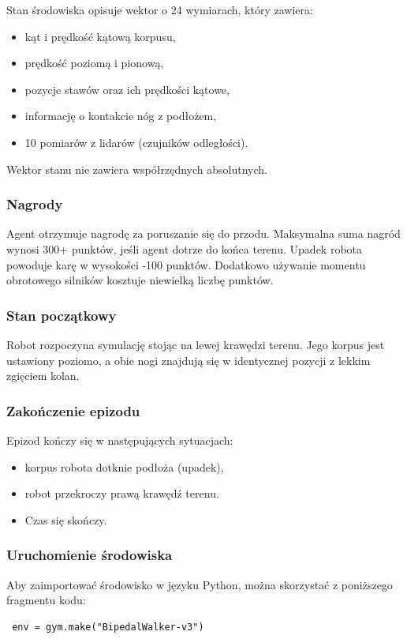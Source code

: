 \documentclass[conference]{IEEEtran}
\begin{document}
Stan środowiska opisuje wektor o 24 wymiarach, który zawiera:
\begin{itemize}
    \item kąt i prędkość kątową korpusu,
    \item prędkość poziomą i pionową,
    \item pozycje stawów oraz ich prędkości kątowe,
    \item informację o kontakcie nóg z podłożem,
    \item 10 pomiarów z lidarów (czujników odległości).
\end{itemize}
Wektor stanu nie zawiera współrzędnych absolutnych.





\subsubsection{Nagrody} 
Agent otrzymuje nagrodę za poruszanie się do przodu. Maksymalna suma nagród wynosi 300+ punktów, jeśli agent dotrze do końca terenu. Upadek robota powoduje karę w wysokości -100 punktów. Dodatkowo używanie momentu obrotowego silników kosztuje niewielką liczbę punktów.

\subsubsection{Stan początkowy}

Robot rozpoczyna symulację stojąc na lewej krawędzi terenu. Jego korpus jest ustawiony poziomo, a obie nogi znajdują się w identycznej pozycji z lekkim zgięciem kolan.

\subsubsection{Zakończenie epizodu}

Epizod kończy się w następujących sytuacjach:
\begin{itemize}
    \item korpus robota dotknie podłoża (upadek),
    \item robot przekroczy prawą krawędź terenu.
    \item Czas się skończy.
\end{itemize}
\subsubsection{Uruchomienie środowiska}
Aby zaimportować środowisko w języku Python, można skorzystać z poniższego fragmentu kodu: \begin{verbatim} env = gym.make("BipedalWalker-v3") \end{verbatim}
\end{document}
